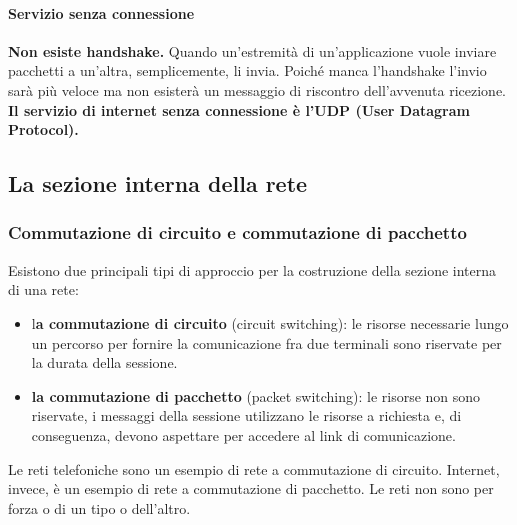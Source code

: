 \documentclass[11pt,a4paper]{article}
\begin{document}
\paragraph{Servizio senza connessione}
\textbf{Non esiste handshake.} Quando un’estremità di un’applicazione vuole inviare pacchetti a un’altra, semplicemente, li invia. Poiché manca l’handshake l’invio sarà più veloce ma non esisterà un messaggio di riscontro dell’avvenuta ricezione.
\textbf{Il servizio di internet senza connessione è l’UDP (User Datagram Protocol).}

\subsection{La sezione interna della rete}
\subsubsection{Commutazione di circuito e commutazione di pacchetto}
Esistono due principali tipi di approccio per la costruzione della sezione interna di una rete:
\begin{itemize}
	\item l\textbf{a commutazione di circuito} (circuit switching): le risorse necessarie lungo un percorso per fornire la comunicazione fra due terminali sono riservate per la durata della sessione.
	\item \textbf{la commutazione di pacchetto} (packet switching): le risorse non sono riservate, i messaggi della sessione utilizzano le risorse a richiesta e, di conseguenza, devono aspettare per accedere al link di comunicazione.
\end{itemize}
Le reti telefoniche sono un esempio di rete a commutazione di circuito. Internet, invece, è un esempio di rete a commutazione di pacchetto. Le reti non sono per forza o di un tipo o dell’altro.
\end{document}
